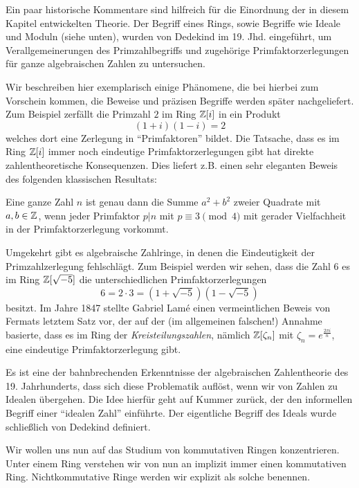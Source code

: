 \documentclass{book}
\begin{document}
Ein paar historische Kommentare sind hilfreich für die Einordnung der in diesem
Kapitel entwickelten Theorie. Der Begriff eines Rings, sowie Begriffe wie
Ideale und Moduln (siehe unten), wurden von Dedekind im 19. Jhd. eingeführt, um
Verallgemeinerungen des Primzahlbegriffs und zugehörige Primfaktorzerlegungen
für ganze algebraischen Zahlen zu untersuchen. 

Wir beschreiben hier exemplarisch einige Phänomene, die bei hierbei zum
Vorschein kommen, die Beweise und präzisen Begriffe werden später
nachgeliefert. Zum Beispiel zerfällt die Primzahl $2$ im Ring $\mathbb{Z}[i]$ in ein
Produkt
\[
    (1+i)(1-i) = 2 
\]
welches dort eine Zerlegung in ``Primfaktoren'' bildet.
Die Tatsache, dass es im Ring $\mathbb{Z}[i]$ immer noch eindeutige
Primfaktorzerlegungen gibt hat direkte zahlentheoretische Konsequenzen. Dies
liefert z.B. einen sehr eleganten Beweis des folgenden klassischen Resultats:

\begin{thm}
    \label{thm:quadrat_summe}
    Eine ganze Zahl $n$ ist genau dann die Summe $a^2 + b^2$ zweier
    Quadrate mit $a,b \in \mathbb{Z}$, wenn jeder Primfaktor $p | n $ mit $p \equiv 3
    \pmod{4}$ mit gerader Vielfachheit in der Primfaktorzerlegung vorkommt.
\end{thm}

Umgekehrt gibt es algebraische Zahlringe, in denen die Eindeutigkeit der
Primzahlzerlegung fehlschlägt. Zum Beispiel werden wir sehen, dass die Zahl $6$
es im Ring $\mathbb{Z}[\sqrt{-5}]$ die unterschiedlichen Primfaktorzerlegungen 
\[
    6 = 2 \cdot 3 = (1 + \sqrt{-5})(1 - \sqrt{-5})
\]
besitzt. Im Jahre 1847 stellte Gabriel Lam\'{e} einen vermeintlichen Beweis von
Fermats letztem Satz vor, der auf der (im allgemeinen falschen!) Annahme
basierte, dass es im Ring der {\em Kreisteilungszahlen}, nämlich $\mathbb{Z}[\zeta_n]$
mit $\zeta_n = e^{\frac{2 \pi i}{n}}$, eine eindeutige Primfaktorzerlegung
gibt.

Es ist eine der bahnbrechenden Erkenntnisse der algebraischen Zahlentheorie des
19. Jahrhunderts, dass sich diese Problematik auflöst, wenn wir von Zahlen zu
Idealen übergehen. Die Idee hierfür geht auf Kummer zurück, der den informellen
Begriff einer ``idealen Zahl'' einführte. Der eigentliche Begriff des Ideals
wurde schließlich von Dedekind definiert.

\begin{konv}
    Wir wollen uns nun auf das Studium von kommutativen Ringen konzentrieren.
    Unter einem Ring verstehen wir von nun an implizit immer einen kommutativen
    Ring. Nichtkommutative Ringe werden wir explizit als solche benennen. 
\end{konv}
\end{document}
